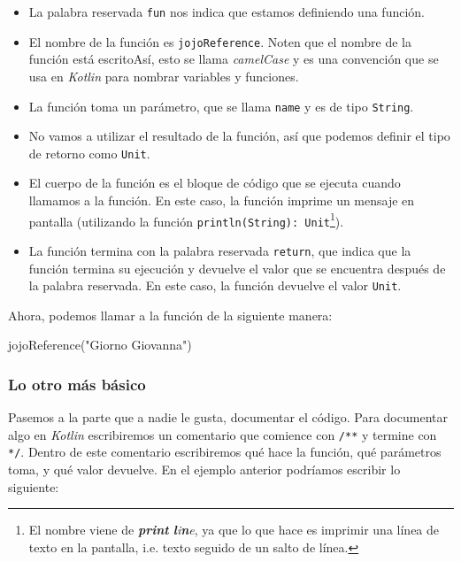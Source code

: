       \begin{itemize}
        \item La palabra reservada \texttt{fun} nos indica que estamos definiendo una función.
        \item El nombre de la función es \texttt{jojoReference}.
          Noten que el nombre de la función está escritoAsí, esto se llama \textit{camelCase} y es
          una convención que se usa en \textit{Kotlin} para nombrar variables y funciones.
        \item La función toma un parámetro, que se llama \texttt{name} y es de tipo \texttt{String}.
        \item No vamos a utilizar el resultado de la función, así que podemos definir el tipo de 
          retorno como \texttt{Unit}.
        \item El cuerpo de la función es el bloque de código que se ejecuta cuando llamamos a la
          función.
          En este caso, la función imprime un mensaje en pantalla (utilizando la función 
          \texttt{println(String): Unit}\footnote{El nombre viene de \textit{\textbf{print} 
          \textbf{l}i\textbf{n}e}, ya que lo que hace es imprimir una línea de texto en la pantalla, 
          i.e. texto seguido de un salto de línea.}).
        \item La función termina con la palabra reservada \texttt{return}, que indica que la función
          termina su ejecución y devuelve el valor que se encuentra después de la palabra reservada.
          En este caso, la función devuelve el valor \texttt{Unit}.   
      \end{itemize}

      Ahora, podemos llamar a la función de la siguiente manera:

      \begin{kotlin}
        jojoReference("Giorno Giovanna")
      \end{kotlin}

    \subsubsection{Lo otro más básico}
      Pasemos a la parte que a nadie le gusta, documentar el código.
      Para documentar algo en \textit{Kotlin} escribiremos un comentario que comience con \texttt{/**}
      y termine con \texttt{*/}.
      Dentro de este comentario escribiremos qué hace la función, qué parámetros toma, y qué valor
      devuelve.
      En el ejemplo anterior podríamos escribir lo siguiente:

